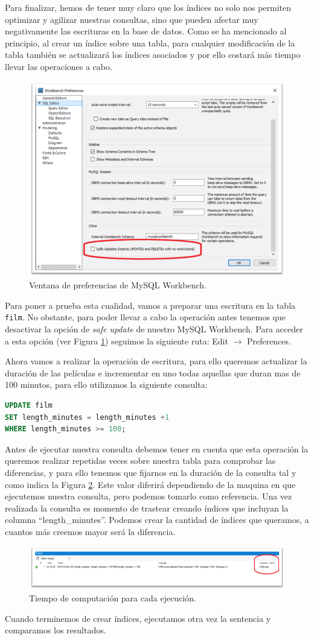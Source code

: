\documentclass{db-practice}
\begin{document}
Para finalizar, hemos de tener muy claro que los índices no solo nos permiten optimizar y agilizar nuestras consultas, sino que pueden afectar muy negativamente las escrituras en la base de datos. Como se ha mencionado al principio, al crear un índice sobre una tabla, para cualquier modificación de la tabla también se actualizará los índices asociados y por ello costará más tiempo llevar las operaciones a cabo.

\begin{figure}[ht]
    \centering
    \includegraphics[width=0.6\columnwidth]{figs/WorkbenchPreferences.png}
    \caption{Ventana de preferencias de MySQL Workbench.}\label{fig:preferences}
\end{figure}

Para poner a prueba esta cualidad, vamos a preparar una escritura en la tabla \texttt{film}. No obstante, para poder llevar a cabo la operación antes tenemos que desactivar la opción de \emph{safe update} de nuestro MySQL Workbench. Para acceder a esta opción (ver Figura \ref{fig:preferences}) seguimos la siguiente ruta: Edit $\rightarrow$ Preferences.

Ahora vamos a realizar la operación de escritura, para ello queremos actualizar la duración de las películas e incrementar en uno todas aquellas que duran mas de 100 minutos, para ello utilizamos la siguiente consulta:

\begin{lstlisting}[language=SQL]
UPDATE film
SET length_minutes = length_minutes +1 
WHERE length_minutes >= 100;
\end{lstlisting}

Antes de ejecutar nuestra consulta debemos tener en cuenta que esta operación la queremos realizar repetidas veces sobre nuestra tabla para comprobar las diferencias, y para ello tenemos que fijarnos en la duración de la consulta tal y como indica la Figura \ref{fig:tiempoEjecucion}. Este valor diferirá dependiendo de la maquina en que ejecutemos nuestra consulta, pero podemos tomarlo como referencia. Una vez realizada la consulta es momento de trastear creando índices que incluyan la columna ``length\_minutes''. Podemos crear la cantidad de índices que queramos, a cuantos más creemos mayor será la diferencia. 

\begin{figure}[ht]
    \centering
    \includegraphics[width=0.9\columnwidth]{figs/tiempoEjecucion.png}
    \caption{Tiempo de computación para cada ejecución.}\label{fig:tiempoEjecucion}
\end{figure}

Cuando terminemos de crear índices, ejecutamos otra vez la sentencia y comparamos los resultados.
\end{document}
